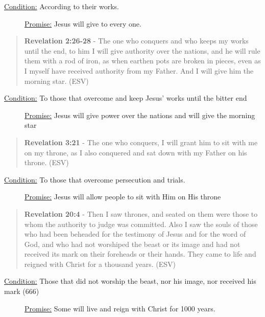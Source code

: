 \documentclass[11pt]{article}
\begin{document}
\begin{description}
\item[{\uline{Condition:} According to their works.}] \uline{Promise:} Jesus will give to every one.
\end{description}

\begin{quote}
\textbf{Revelation 2:26-28} - The one who conquers and who keeps my works until the end, to him I will give authority over the nations, and he will rule them with a rod of iron, as when earthen pots are broken in pieces, even as I myself have received authority from my Father. And I will give him the morning star. (ESV)
\end{quote}

\begin{description}
\item[{\uline{Condition:} To those that overcome and keep Jesus' works until the bitter end}] \uline{Promise:} Jesus will give power over the nations and will give the morning star
\end{description}

\begin{quote}
\textbf{Revelation 3:21} - The one who conquers, I will grant him to sit with me on my throne, as I also conquered and sat down with my Father on his throne. (ESV)
\end{quote}

\begin{description}
\item[{\uline{Condition:} To those that overcome persecution and trials.}] \uline{Promise:} Jesus will allow people to sit with Him on His throne
\end{description}

\begin{quote}
\textbf{Revelation 20:4} - Then I saw thrones, and seated on them were those to whom the authority to judge was committed. Also I saw the souls of those who had been beheaded for the testimony of Jesus and for the word of God, and who had not worshiped the beast or its image and had not received its mark on their foreheads or their hands. They came to life and reigned with Christ for a thousand years. (ESV)
\end{quote}

\begin{description}
\item[{\uline{Condition:} Those that did not worship the beast, nor his image, nor received his mark (666)}] \uline{Promise:} Some will live and reign with Christ for 1000 years.
\end{description}
\end{document}
